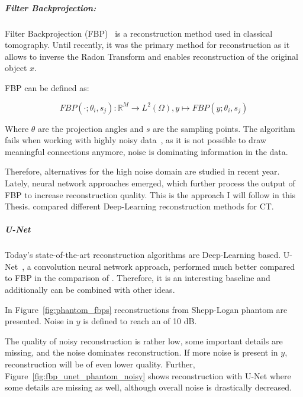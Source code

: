 \subparagraph{Filter Backprojection:}
Filter Backprojection (FBP)~\cite{tomographicReconstruction} is a reconstruction method used in classical tomography.
Until recently, it was the primary method for reconstruction as it allows to inverse the Radon Transform and 
enables reconstruction of the original object $x$.

FBP can be defined as:

\begin{equation}
    \label{eq:fbp}
    \textit{FBP}(\cdot; \theta_i, s_j) : \mathbb{R}^M \to L^2(\Omega), y \mapsto \textit{FBP}(y; \theta_i, s_j)
\end{equation}

Where $\theta$ are the projection angles and $s$ are the sampling points.
The algorithm fails when working with highly noisy data~\cite{cryoEmMath2}, as it is not possible to draw meaningful connections anymore, noise
is dominating information in the data.

Therefore, alternatives for the high noise domain are studied in recent year.
Lately, neural network approaches emerged, which further process the output of FBP to increase reconstruction quality.
This is the approach I will follow in this Thesis. \citet{ct-reconstruction-comparison} compared different 
Deep-Learning reconstruction methods for CT. 

\subparagraph{U-Net}
Today's state-of-the-art reconstruction algorithms are Deep-Learning based.
U-Net~\cite{unet-tomography}, a convolution neural network approach, performed
much better compared to FBP in the comparison of \citet{ct-reconstruction-comparison}.
Therefore, it is an interesting baseline and additionally can be combined with other ideas.

In Figure~\ref{fig:phantom_fbps} reconstructions from Shepp-Logan phantom are presented.
Noise in $y$ is defined to reach an \snry of 10 dB.

The quality of noisy reconstruction is rather low, some important details are missing, and the noise dominates reconstruction.
If more noise is present in $y$, reconstruction will be of even lower quality.
Further, Figure~\ref{fig:fbp_unet_phantom_noisy} 
shows reconstruction with U-Net where some details are missing as well, although overall noise is drastically decreased.


